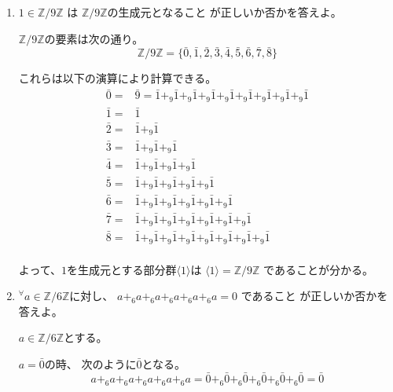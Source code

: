 \documentclass[12pt,b5paper]{ltjsarticle}
\begin{document}
\begin{enumerate}
 \item
      $1 \in \mathbb{Z}/9\mathbb{Z}$
      は
      $\mathbb{Z}/9\mathbb{Z}$の生成元となること
      が正しいか否かを答えよ。

\dotfill

      $\mathbb{Z}/9\mathbb{Z}$の要素は次の通り。
      \begin{equation}
       \mathbb{Z}/9\mathbb{Z}=
        \{ \bar{0},\bar{1},\bar{2},\bar{3},\bar{4},\bar{5},
        \bar{6},\bar{7},\bar{8}\}
      \end{equation}

      これらは以下の演算により計算できる。
      \begin{align}
       \bar{0} =& \bar{9}
       = \bar{1}+_{9} \bar{1}+_{9} \bar{1}+_{9} \bar{1}+_{9}
       \bar{1}+_{9} \bar{1}+_{9} \bar{1}+_{9} \bar{1}+_{9} \bar{1}\\
       \bar{1}=& \bar{1}\\
       \bar{2} =& \bar{1}+_{9}\bar{1}\\
       \bar{3} =& \bar{1}+_{9}\bar{1}+_{9}\bar{1}\\
       \bar{4} =& \bar{1}+_{9}\bar{1}+_{9}\bar{1}+_{9}\bar{1}\\
       \bar{5} =& \bar{1}+_{9}\bar{1}+_{9}\bar{1}+_{9}\bar{1}+_{9}\bar{1}\\
       \bar{6} =& \bar{1}+_{9}\bar{1}+_{9}\bar{1}+_{9}\bar{1}+_{9}\bar{1}+_{9}\bar{1}\\
       \bar{7} =& \bar{1}+_{9}\bar{1}+_{9}\bar{1}+_{9}\bar{1}+_{9}\bar{1}+_{9}\bar{1}+_{9}\bar{1}\\
       \bar{8} =& \bar{1}+_{9}\bar{1}+_{9}\bar{1}+_{9}\bar{1}+_{9}\bar{1}+_{9}\bar{1}+_{9}\bar{1}+_{9}\bar{1}\\
      \end{align}

      よって、$1$を生成元とする部分群$\langle 1 \rangle$は
      $\langle 1 \rangle = \mathbb{Z}/9\mathbb{Z}$
      であることが分かる。

\hrulefill
 \item
      ${}^{\forall} a\in\mathbb{Z}/6\mathbb{Z}$に対し、
      $a +_{6} a +_{6} a +_{6} a +_{6} a +_{6} a =0$
      であること
      が正しいか否かを答えよ。

\dotfill

      $a\in\mathbb{Z}/6\mathbb{Z}$とする。

      $a=\bar{0}$の時、
      次のように$\bar{0}$となる。
      \begin{equation}
       a +_{6} a +_{6} a +_{6} a +_{6} a +_{6} a
        =
       \bar{0} +_{6} \bar{0} +_{6} \bar{0} +_{6} \bar{0} +_{6} \bar{0} +_{6} \bar{0} = \bar{0}
      \end{equation}


\end{enumerate}
\end{document}
